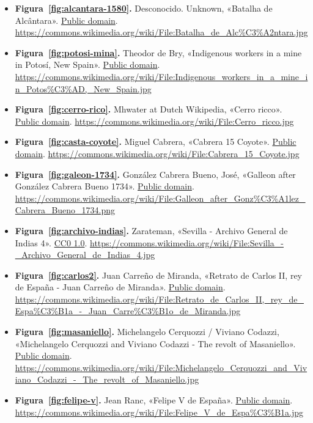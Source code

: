 \documentclass{book}
\begin{document}
\begin{itemize}
\item \textbf{Figura~\ref{fig:alcantara-1580}.} Desconocido. Unknown, «Batalha de Alcântara». \href{https://creativecommons.org/publicdomain/mark/1.0/}{Public domain}. \url{https://commons.wikimedia.org/wiki/File:Batalha_de_Alc%C3%A2ntara.jpg}
\item \textbf{Figura~\ref{fig:potosi-mina}.} Theodor de Bry, «Indigenous workers in a mine in Potosí, New Spain». \href{https://creativecommons.org/publicdomain/mark/1.0/}{Public domain}. \url{https://commons.wikimedia.org/wiki/File:Indigenous_workers_in_a_mine_in_Potos%C3%AD,_New_Spain.jpg}
\item \textbf{Figura~\ref{fig:cerro-rico}.} Mhwater at Dutch Wikipedia, «Cerro ricco». \href{https://creativecommons.org/publicdomain/mark/1.0/}{Public domain}. \url{https://commons.wikimedia.org/wiki/File:Cerro_ricco.jpg}
\item \textbf{Figura~\ref{fig:casta-coyote}.} Miguel Cabrera, «Cabrera 15 Coyote». \href{https://creativecommons.org/publicdomain/mark/1.0/}{Public domain}. \url{https://commons.wikimedia.org/wiki/File:Cabrera_15_Coyote.jpg}
\item \textbf{Figura~\ref{fig:galeon-1734}.} González Cabrera Bueno, José, «Galleon after González Cabrera Bueno 1734». \href{https://creativecommons.org/publicdomain/mark/1.0/}{Public domain}. \url{https://commons.wikimedia.org/wiki/File:Galleon_after_Gonz%C3%A1lez_Cabrera_Bueno_1734.png}
\item \textbf{Figura~\ref{fig:archivo-indias}.} Zarateman, «Sevilla - Archivo General de Indias 4». \href{https://creativecommons.org/publicdomain/zero/1.0/}{CC0 1.0}. \url{https://commons.wikimedia.org/wiki/File:Sevilla_-_Archivo_General_de_Indias_4.jpg}
\item \textbf{Figura~\ref{fig:carlos2}.} Juan Carreño de Miranda, «Retrato de Carlos II, rey de España - Juan Carreño de Miranda». \href{https://creativecommons.org/publicdomain/mark/1.0/}{Public domain}. \url{https://commons.wikimedia.org/wiki/File:Retrato_de_Carlos_II,_rey_de_Espa%C3%B1a_-_Juan_Carre%C3%B1o_de_Miranda.jpg}
\item \textbf{Figura~\ref{fig:masaniello}.} Michelangelo Cerquozzi / Viviano Codazzi, «Michelangelo Cerquozzi and Viviano Codazzi - The revolt of Masaniello». \href{https://creativecommons.org/publicdomain/mark/1.0/}{Public domain}. \url{https://commons.wikimedia.org/wiki/File:Michelangelo_Cerquozzi_and_Viviano_Codazzi_-_The_revolt_of_Masaniello.jpg}
\item \textbf{Figura~\ref{fig:felipe-v}.} Jean Ranc, «Felipe V de España». \href{https://creativecommons.org/publicdomain/mark/1.0/}{Public domain}. \url{https://commons.wikimedia.org/wiki/File:Felipe_V_de_Espa%C3%B1a.jpg}

\end{itemize}
\end{document}
